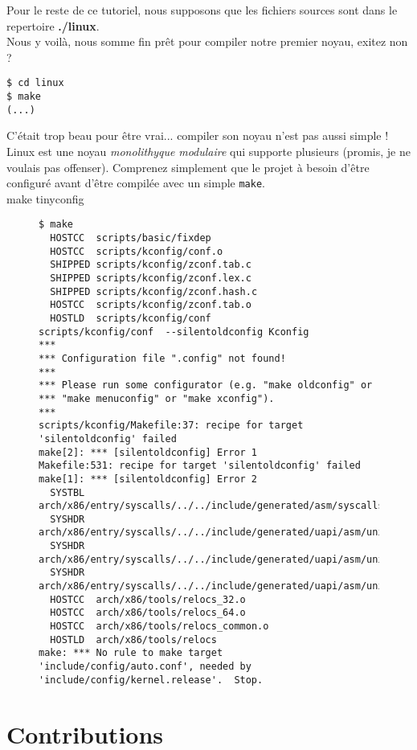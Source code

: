 \documentclass[a4paper]{article}
\begin{document}
Pour le reste de ce tutoriel, nous supposons que les fichiers sources sont dans le repertoire \textbf{./linux}.\\

Nous y voilà, nous somme fin prêt pour compiler notre premier noyau, exitez non ?

\begin{verbatim}
$ cd linux
$ make
(...)
\end{verbatim}

C'était trop beau pour être vrai... compiler son noyau n'est pas aussi simple ! Linux est une noyau \textit{monolithyque} \textit{modulaire} qui supporte plusieurs  (promis, je ne voulais pas offenser). Comprenez simplement que le projet à besoin d'être configuré avant d'être compilée avec un simple \lstset{language=sh}\lstinline{make}.\\
make tinyconfig

\begin{figure}
\begin{verbatim}
$ make
  HOSTCC  scripts/basic/fixdep
  HOSTCC  scripts/kconfig/conf.o
  SHIPPED scripts/kconfig/zconf.tab.c
  SHIPPED scripts/kconfig/zconf.lex.c
  SHIPPED scripts/kconfig/zconf.hash.c
  HOSTCC  scripts/kconfig/zconf.tab.o
  HOSTLD  scripts/kconfig/conf
scripts/kconfig/conf  --silentoldconfig Kconfig
***
*** Configuration file ".config" not found!
***
*** Please run some configurator (e.g. "make oldconfig" or
*** "make menuconfig" or "make xconfig").
***
scripts/kconfig/Makefile:37: recipe for target 'silentoldconfig' failed
make[2]: *** [silentoldconfig] Error 1
Makefile:531: recipe for target 'silentoldconfig' failed
make[1]: *** [silentoldconfig] Error 2
  SYSTBL  arch/x86/entry/syscalls/../../include/generated/asm/syscalls_32.h
  SYSHDR  arch/x86/entry/syscalls/../../include/generated/uapi/asm/unistd_32.h
  SYSHDR  arch/x86/entry/syscalls/../../include/generated/uapi/asm/unistd_64.h
  SYSHDR  arch/x86/entry/syscalls/../../include/generated/uapi/asm/unistd_x32.h
  HOSTCC  arch/x86/tools/relocs_32.o
  HOSTCC  arch/x86/tools/relocs_64.o
  HOSTCC  arch/x86/tools/relocs_common.o
  HOSTLD  arch/x86/tools/relocs
make: *** No rule to make target 'include/config/auto.conf', needed by 'include/config/kernel.release'.  Stop.
\end{verbatim}
\caption{}
\end{figure}

\clearpage
\appendix

\section{Contributions}

\clearpage
\listoffigures

\clearpage
\listoftables
\end{document}
